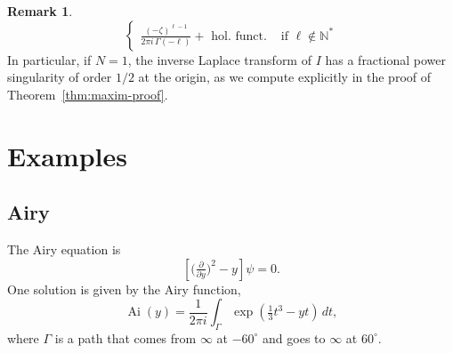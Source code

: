 \documentclass{article}
\DeclareMathOperator{\Ai}{Ai}
\theoremstyle{definition}
\newtheorem{remark}[definition]{Remark}
\theoremstyle{plain}
\begin{document}
{\begin{remark}
\begin{equation*}
\begin{cases}
           \frac{(-\zeta)^{\ell-1}}{2\pi i\, \Gamma(-\ell)}+ \text{ hol. funct.} & \text{ if } \ell\notin \mathbb{N}^* 
       \end{cases}
   \end{equation*}
In particular, if $N=1$, the inverse Laplace transform of $I$ has a fractional power singularity of order $1/2$ at the origin, as we compute explicitly in the proof of Theorem~\ref{thm:maxim-proof}. %
\end{remark}
\section{Examples}\label{sec:examples}

\subsection{Airy}

The Airy equation is
\begin{equation}\label{eqn:airy}
\left[\big(\tfrac{\partial}{\partial y}\big)^2 - y\right] \psi = 0.
\end{equation}
One solution is given by the Airy function,
\[ \Ai(y) = \frac{1}{2\pi i} \int_{\Gamma} \exp\left(\tfrac{1}{3}t^3 - yt\right)\,dt, \]
where $\Gamma$ is a path that comes from $\infty$ at $-60^\circ$ and goes to $\infty$ at $60^\circ$.

}
\end{document}
